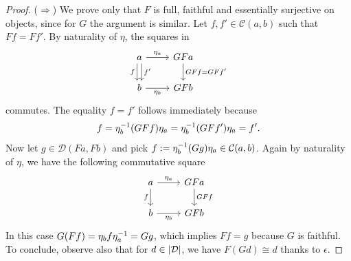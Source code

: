\begin{proof}
  (\(\Rightarrow\)) We prove only that \(F\) is full, faithful and essentially
  surjective on objects, since for \(G\) the argument is similar. Let
  \(f, f' \in \mathcal{C} (a, b)\) such that \(Ff = Ff'\). By naturality of
  \(\eta\), the squares in
  \[
    \begin{tikzcd}
      a \ar["{f}", d, swap, shift right] \ar["{f'}", d, shift left] \ar["{\eta_a}", r] & GFa \ar["{GFf = GFf'}", d] \\
      b \ar["{\eta_b}", r, swap] & GFb
    \end{tikzcd}
  \]
  commutes. The equality \(f = f'\) follows immediately because
  \[
    f = \eta^{-1}_b (GF f) \eta_a = \eta^{-1}_b (GF f') \eta_a = f' .
  \]
  Now let \(g \in \mathcal{D}(Fa, Fb)\) and pick
  \(f := \eta^{-1}_b(Gg) \eta_a \in \mathcal{C}(a, b)\). Again by naturality of
  \(\eta\), we have the following commutative square
  \[
    \begin{tikzcd}
      a \ar["{f}", d, swap] \ar["{\eta_a}", r] & GFa \ar["{GFf}", d] \\
      b \ar["{\eta_b}", r, swap] & GFb
    \end{tikzcd}
  \]
  In this case \(G(Ff) = \eta_b f \eta^{-1}_a = Gg\), which implies
  \(Ff = g\) because \(G\) is faithful. To conclude, observe also that
  for \(d \in \left\lvert\mathcal{D}\right\rvert\), we have \(F(Gd) \cong d\) thanks to \(\epsilon\).


\end{proof}
